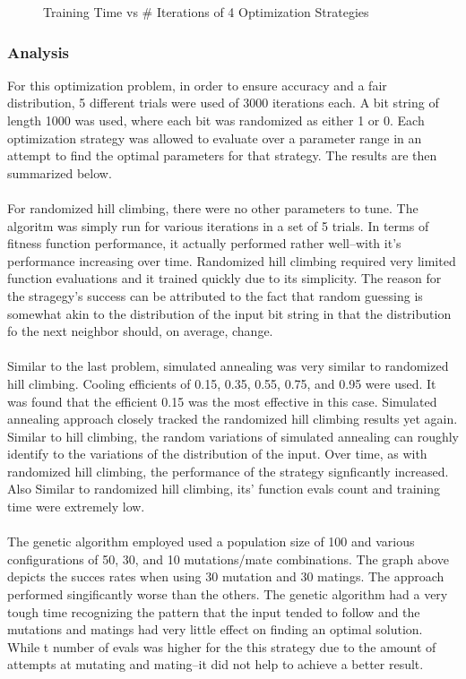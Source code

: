 \documentclass[h]{article}
\begin{document}
\begin{figure}[H]
      \caption*{Training Time vs # Iterations of 4 Optimization Strategies} 
   \endminipage\hfill
\end{figure}

\subsubsection*{Analysis}
For this optimization problem, in order to ensure accuracy and a fair distribution, 5 different trials were 
used of 3000 iterations each.  A bit string of length 1000 was used, where each 
bit was randomized as either 1 or 0.  Each optimization strategy was allowed to evaluate over 
a parameter range in an attempt to find the optimal parameters for that 
strategy.  The results are then summarized below.
\\ \\
For randomized hill climbing, there were no other parameters to tune.  The 
algoritm was simply run for various iterations in a set of 5 
trials.  In terms of fitness function performance, it actually performed rather well--with it's performance increasing over time. Randomized 
hill climbing required very limited function evaluations and it trained quickly due to its simplicity.  The reason for the stragegy's success can  be 
attributed to the fact that random guessing is somewhat akin to the distribution 
of the input bit string in that the distribution fo the next neighbor should, on 
average, change.
\\ \\
Similar to the last problem, simulated annealing was very similar to randomized hill climbing.  Cooling efficients of 0.15, 
0.35, 0.55, 0.75, and 0.95 were used.  It was found that the efficient 0.15 was 
the most effective in this case.  Simulated annealing approach closely tracked the randomized hill climbing results yet again. 
 Similar to hill climbing, the random variations of simulated annealing can roughly identify to the variations of the distribution of the input.  Over time, as with 
 randomized hill climbing, the performance of the strategy signficantly increased.  Also Similar to randomized hill climbing, its' 
 function evals count and training time were extremely low.
\\ \\

The genetic algorithm employed used a population size of 100 and various 
configurations of 50, 30, and 10 mutations/mate combinations.  The graph above 
depicts the succes rates when using 30 mutation and 30 matings.  The approach performed singificantly worse than the others.
  The genetic algorithm had a very tough time recognizing the pattern that the 
  input tended to follow and the mutations and matings had very little effect on 
  finding an optimal solution.  While t number of  evals was higher for the this strategy due to the amount of attempts 
at mutating and mating--it did not help to achieve a better result.
\\ \\
\end{document}
